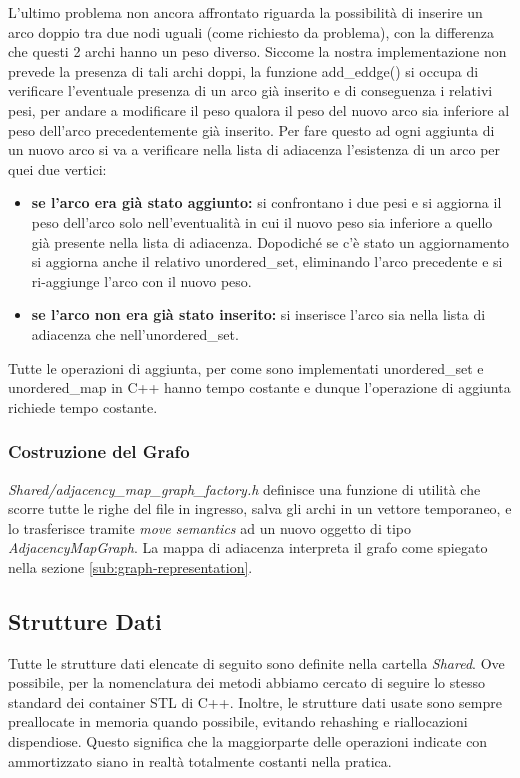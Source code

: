 L'ultimo problema non ancora affrontato riguarda la possibilità di inserire un arco doppio tra due nodi uguali (come richiesto da problema), con la differenza che questi 2 archi hanno un peso diverso. Siccome la nostra implementazione non prevede la presenza di tali archi doppi, la funzione add\_eddge() si occupa di verificare l'eventuale presenza di un arco già inserito e di conseguenza i relativi pesi, per andare a modificare il peso qualora il peso del nuovo arco sia inferiore al peso dell'arco precedentemente già inserito. Per fare questo ad ogni aggiunta di un nuovo arco si va a verificare nella lista di adiacenza l'esistenza di un arco per quei due vertici:
\begin{itemize}
	\item \textbf{se l'arco era già stato aggiunto:} si confrontano i due pesi e si aggiorna il peso dell'arco solo nell'eventualità in cui il nuovo peso sia inferiore a quello già presente nella lista di adiacenza. Dopodiché se c'è stato un aggiornamento si aggiorna anche il relativo unordered\_set, eliminando l'arco precedente e si ri-aggiunge l'arco con il nuovo peso. 
	\item \textbf{se l'arco non era già stato inserito:} si inserisce l'arco sia nella lista di adiacenza che nell'unordered\_set.
\end{itemize}

Tutte le operazioni di aggiunta, per come sono implementati unordered\_set e unordered\_map in C++ hanno tempo costante e dunque l'operazione di aggiunta richiede tempo costante.

\subsubsection {Costruzione del Grafo}

\textit{Shared/adjacency\_map\_graph\_factory.h} definisce una funzione di utilità che scorre tutte le righe del file in ingresso, salva gli archi in un vettore temporaneo, e lo trasferisce tramite \textit{move semantics} ad un nuovo oggetto di tipo \textit{AdjacencyMapGraph}. La mappa di adiacenza interpreta il grafo come spiegato nella sezione \ref{sub:graph-representation}.

\subsection{Strutture Dati}

Tutte le strutture dati elencate di seguito sono definite nella cartella \textit{Shared}.
Ove possibile, per la nomenclatura dei metodi abbiamo cercato di seguire lo stesso standard dei container STL di C++.
Inoltre, le strutture dati usate sono sempre preallocate in memoria quando possibile, evitando rehashing e riallocazioni dispendiose. Questo significa che la maggiorparte delle operazioni indicate con  ammortizzato siano in realtà totalmente costanti nella pratica.

